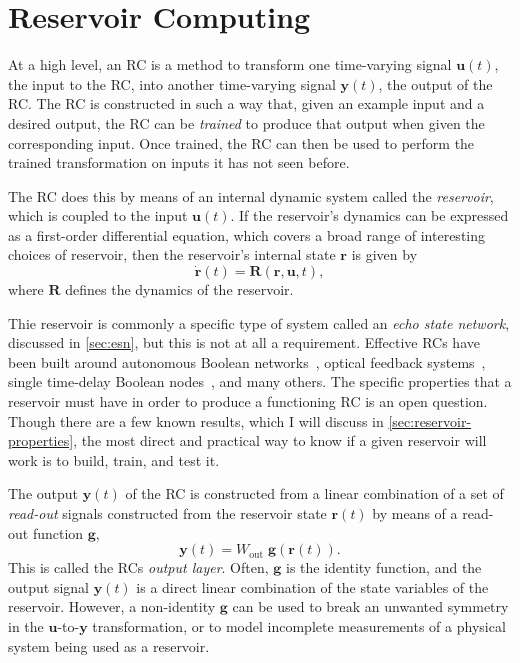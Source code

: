 \chapter{Reservoir Computing}\label{ch:reservoir-computing}

At a high level, an RC is a method to transform one time-varying
signal $\bm{u}(t)$, the input to the RC, into another time-varying
signal $\bm{y}(t)$, the output of the RC. The RC is constructed in
such a way that, given an example input and a desired output, the RC
can be \emph{trained} to produce that output when given the
corresponding input. Once trained, the RC can then be used to perform
the trained transformation on inputs it has not seen before.

The RC does this by means of an internal dynamic system called the
\emph{reservoir}, which is coupled to the input $\bm{u}(t)$. If the
reservoir's dynamics can be expressed as a first-order differential
equation, which covers a broad range of interesting choices of
reservoir, then the reservoir's internal state $\bm{r}$ is given by
\begin{equation}
  \label{eq:reservoir}
  \dot{\mathbf{r}}(t) = \mathbf{R}\left(\mathbf{r}, \mathbf{u}, t\right),
\end{equation}
where $\mathbf{R}$ defines the dynamics of the reservoir.

Thie reservoir is commonly a specific type of system called an
\emph{echo state network}, discussed in \cref{sec:esn}, but this is
not at all a requirement. Effective RCs have been built around
autonomous Boolean networks~\cite{canaday2018}, optical feedback
systems~\cite{antonik2016}, single time-delay Boolean
nodes~\cite{haynes2015}, and many others. The specific properties that
a reservoir must have in order to produce a functioning RC is an open
question. Though there are a few known results, which I will discuss
in \cref{sec:reservoir-properties}, the most direct and practical way
to know if a given reservoir will work is to build, train, and test
it.

The output $\bm{y}(t)$ of the RC is constructed from a linear
combination of a set of \emph{read-out} signals constructed from the
reservoir state $\bm{r}(t)$ by means of a read-out function $\bm{g}$,
\begin{equation}
  \label{eq:output}
  \bm{y}(t) = W_\text{out}\;\bm{g}\left(\bm{r}(t)\right).
\end{equation}
This is called the RCs \emph{output layer}. Often, $\bm{g}$ is the
identity function, and the output signal $\bm{y}(t)$ is a direct
linear combination of the state variables of the reservoir. However, a
non-identity $\bm{g}$ can be used to break an unwanted symmetry in the
$\bm{u}$-to-$\bm{y}$ transformation, or to model incomplete
measurements of a physical system being used as a reservoir.

